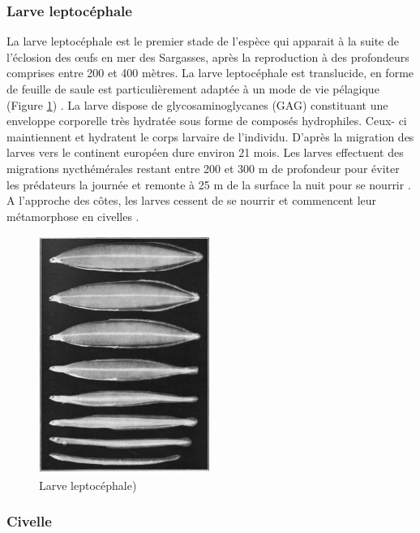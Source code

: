 \documentclass[11pt,titlepage,twoside]{article}\usepackage[]{graphicx}\usepackage[table]{xcolor}
\begin{document}
\subsubsection{Larve leptocéphale}

La larve leptocéphale est le premier stade de l’espèce qui apparait à la suite de l’éclosion des œufs en mer des Sargasses, après la reproduction à des profondeurs comprises entre 200 et 400 mètres. La larve leptocéphale est translucide, en forme de feuille de saule est particulièrement adaptée à un mode de vie pélagique (Figure \ref{larve}) \citep{edeline_role_2005}. La larve dispose de glycosaminoglycanes (GAG) constituant une enveloppe corporelle très hydratée sous forme de composés hydrophiles. Ceux- ci maintiennent et hydratent le corps larvaire de l’individu. D’après \citep{bonhommeau_duration_2010} la migration des larves vers le continent européen dure environ 21 mois. Les larves effectuent des migrations nycthémérales restant entre 200 et 300 m de profondeur pour éviter les prédateurs la journée et remonte à 25 m de la surface la nuit pour se nourrir \citep{castonguay_vertical_1987}. A l’approche des côtes, les larves cessent de se nourrir \citep{edeline_role_2005} et commencent leur métamorphose en civelles \citep{hirschinger_donnees_2015}.

\begin{figure}[htpb]
\centering
\includegraphics[width=0.5\textwidth]{larve}
\caption{Larve leptocéphale)}
\label{larve}
\end{figure}

\subsubsection{Civelle}
\end{document}
